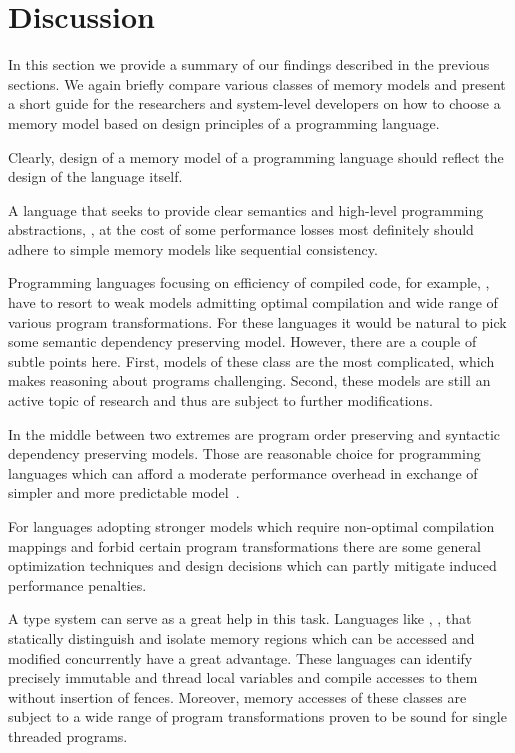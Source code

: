 \section{Discussion}
\label{sec:discussion}

In this section we provide a summary of our findings described in the previous sections. 
We again briefly compare various classes of memory models 
and present a short guide for the researchers and system-level developers 
on how to choose a memory model based on 
design principles of a programming language.   

Clearly, design of a memory model of a programming language
should reflect the design of the language itself. 

A language that seeks to provide clear semantics and 
high-level programming abstractions, \eg \Haskell, at the cost 
of some performance losses most definitely should 
adhere to simple memory models like sequential consistency. 

Programming languages focusing on efficiency 
of compiled code, for example, \CPP, 
have to resort to weak models admitting 
optimal compilation and wide range of 
various program transformations. 
For these languages it would be natural 
to pick some semantic dependency preserving model. 
However, there are a couple of subtle points here. 
First, models of these class are the most complicated, 
which makes reasoning about programs challenging. 
Second, these models are still an active topic 
of research and thus are subject to further modifications.

In the middle between two extremes are program order preserving and 
syntactic dependency preserving models.
Those are reasonable choice for programming languages
which can afford a moderate performance overhead 
in exchange of simpler and more predictable model~\cite{Ou-Demsky:OOPSLA18}.

For languages adopting stronger models which require non-optimal
compilation mappings and forbid certain program transformations
there are some general optimization techniques and design decisions
which can partly mitigate induced performance penalties.

A type system can serve as a great help in this task. 
Languages like \Haskell, \OCaml, \Rust that 
statically distinguish and isolate memory regions 
which can be accessed and modified concurrently have a great advantage.
These languages can identify precisely 
immutable and thread local variables
and compile accesses to them without insertion of fences.
Moreover, memory accesses of these classes are subject to 
a wide range of program transformations proven to be
sound for single threaded programs. 
 
